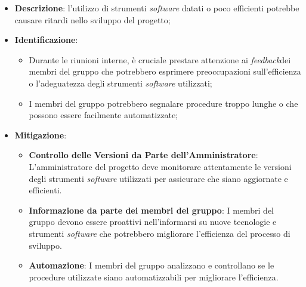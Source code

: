 \label{risk:strumenti software inadeguati}
\begin{itemize}
	\item \textbf{Descrizione}: l'utilizzo di strumenti \textit{software} datati o poco
	      efficienti potrebbe causare ritardi nello sviluppo del progetto;

	\item \textbf{Identificazione}:
	      \begin{itemize}
		      \item Durante le riunioni interne, è cruciale prestare attenzione
		            ai \textit{feedback}\g dei membri del gruppo che potrebbero esprimere
		            preoccupazioni sull'efficienza o l'adeguatezza degli strumenti \textit{software} utilizzati;

		      \item I membri del gruppo potrebbero segnalare procedure troppo lunghe o
		            che possono essere facilmente automatizzate;
	      \end{itemize}

	\item \textbf{Mitigazione}:
	      \begin{itemize}
		      \item \textbf{Controllo delle Versioni da Parte dell'Amministratore}:
		            L'amministratore del progetto deve monitorare attentamente le versioni
		            degli strumenti \textit{software} utilizzati per assicurare che siano aggiornate e efficienti.

		      \item \textbf{Informazione da parte dei membri del gruppo}:
		            I membri del gruppo devono essere proattivi nell'informarsi su nuove tecnologie e
		            strumenti \textit{software} che potrebbero migliorare l'efficienza del processo di sviluppo.

		      \item \textbf{Automazione}:
		            I membri del gruppo analizzano e controllano se le procedure utilizzate siano
		            automatizzabili per migliorare l'efficienza.
	      \end{itemize}
\end{itemize}
